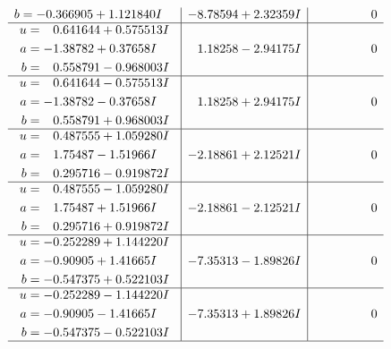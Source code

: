 \documentclass[1p]{elsarticle_modified}
\theoremstyle{definition}
\begin{document}
$$\begin{array}{c|c|c}
\begin{aligned}
b &= -0.366905 + 1.121840 I\end{aligned}
 & -8.78594 + 2.32359 I & \phantom{-0.000000 } 0 \\ \hline\begin{aligned}
u &= \phantom{-}0.641644 + 0.575513 I \\
a &= -1.38782 + 0.37658 I \\
b &= \phantom{-}0.558791 - 0.968003 I\end{aligned}
 & \phantom{-}1.18258 - 2.94175 I & \phantom{-0.000000 } 0 \\ \hline\begin{aligned}
u &= \phantom{-}0.641644 - 0.575513 I \\
a &= -1.38782 - 0.37658 I \\
b &= \phantom{-}0.558791 + 0.968003 I\end{aligned}
 & \phantom{-}1.18258 + 2.94175 I & \phantom{-0.000000 } 0 \\ \hline\begin{aligned}
u &= \phantom{-}0.487555 + 1.059280 I \\
a &= \phantom{-}1.75487 - 1.51966 I \\
b &= \phantom{-}0.295716 - 0.919872 I\end{aligned}
 & -2.18861 + 2.12521 I & \phantom{-0.000000 } 0 \\ \hline\begin{aligned}
u &= \phantom{-}0.487555 - 1.059280 I \\
a &= \phantom{-}1.75487 + 1.51966 I \\
b &= \phantom{-}0.295716 + 0.919872 I\end{aligned}
 & -2.18861 - 2.12521 I & \phantom{-0.000000 } 0 \\ \hline\begin{aligned}
u &= -0.252289 + 1.144220 I \\
a &= -0.90905 + 1.41665 I \\
b &= -0.547375 + 0.522103 I\end{aligned}
 & -7.35313 - 1.89826 I & \phantom{-0.000000 } 0 \\ \hline\begin{aligned}
u &= -0.252289 - 1.144220 I \\
a &= -0.90905 - 1.41665 I \\
b &= -0.547375 - 0.522103 I\end{aligned}
 & -7.35313 + 1.89826 I & \phantom{-0.000000 } 0\\
 \hline 
 \end{array}$$\newpage$$\begin{array}{c|c|c}  

\end{array}$$
\end{document}
